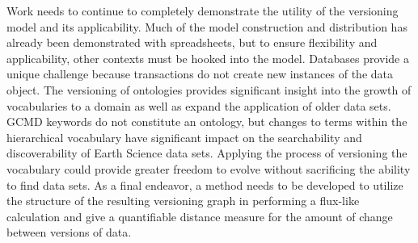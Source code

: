 Work needs to continue to completely demonstrate the utility of the versioning model and its applicability.
Much of the model construction and distribution has already been demonstrated with spreadsheets, but to ensure flexibility and applicability, other contexts must be hooked into the model.
Databases provide a unique challenge because transactions do not create new instances of the data object.
The versioning of ontologies provides significant insight into the growth of vocabularies to a domain as well as expand the application of older data sets.
GCMD keywords do not constitute an ontology, but changes to terms within the hierarchical vocabulary have significant impact on the searchability and discoverability of Earth Science data sets.
Applying the process of versioning the vocabulary could provide greater freedom to evolve without sacrificing the ability to find data sets.
As a final endeavor, a method needs to be developed to utilize the structure of the resulting versioning graph in performing a flux-like calculation and give a quantifiable distance measure for the amount of change between versions of data.
